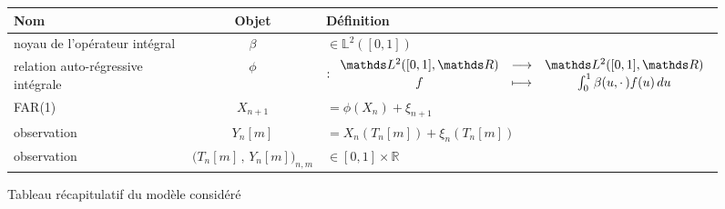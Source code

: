 		\begin{figure}[H]
		\noindent\begin{tabularx}{\textwidth}{XcX}
		\toprule
		\textbf{Nom}                       & \textbf{Objet}                              & \textbf{Définition}                                                                                                \\
		\midrule
		noyau de l'opérateur intégral                & $\beta$                                     & $\in \mathds L^2([0,1])$                                                                                           \\
		relation auto-régressive intégrale           & $\phi$                                      & $: \func{\mathds L^2([0,1], \mathds R)}{\mathds L^2([0,1], \mathds R)}{f}{\int_0^1 \beta(u, \cdot \, )f(u) \, du}$ \\
		FAR(1)                                       & $X_{n+1}$                                   & $= \phi( X_n )+ \xi_{n+1}$                                                                                         \\
		\midrule
		observation                                  & $Y_n[m]$                                    & $= X_n( T_n[m] ) + \xi_n( T_n[m] )$                                                                                \\
		observation                                  & $\bigl( T_n[m] \, , \, Y_n[m] \bigr)_{n,m}$ & $\in [0,1] \times \mathds R$                                                                                       \\
		\bottomrule
	\end{tabularx}
	\caption{Tableau récapitulatif du modèle considéré}
	\label{tab:model}
\end{figure}